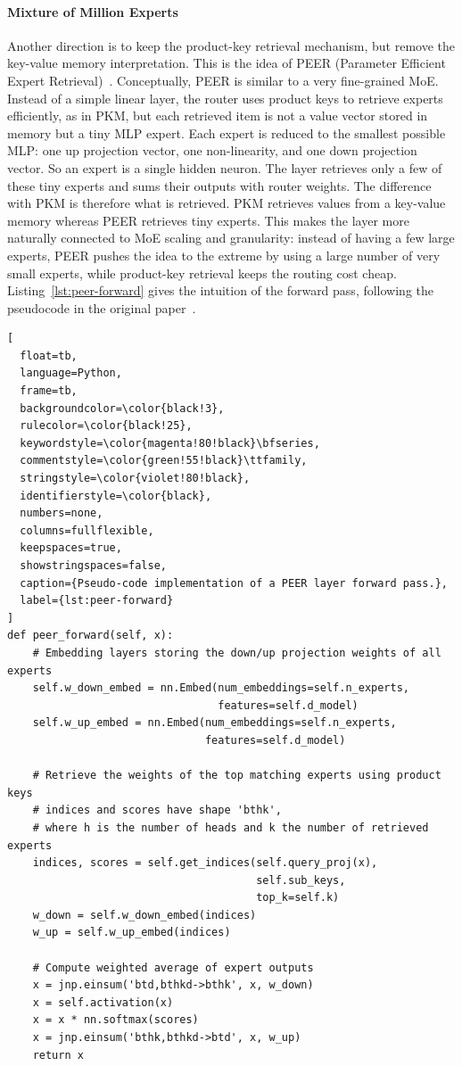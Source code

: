 \paragraph{Mixture of Million Experts}
Another direction is to keep the product-key retrieval mechanism, but remove the
key-value memory interpretation. This is the idea of PEER (Parameter Efficient
Expert Retrieval)~\citep{he2024mixturemillionexperts}. Conceptually,
PEER is similar to a very fine-grained MoE. Instead of a simple linear layer,
the router uses product keys to retrieve experts efficiently, as in PKM, 
but each retrieved item is not a value vector stored in memory but a tiny MLP expert.
Each expert is reduced to the smallest possible MLP: one up
projection vector, one non-linearity, and one down projection vector. So an
expert is a single hidden neuron. The layer retrieves only a few of these
tiny experts and sums their outputs with router weights.
The difference with PKM is therefore what is retrieved. PKM retrieves
values from a key-value memory whereas PEER retrieves tiny experts. This makes the
layer more naturally connected to MoE scaling and granularity: instead of having
a few large experts, PEER pushes the idea to the extreme by using a large
number of very small experts, while product-key retrieval keeps the routing cost
cheap. Listing~\ref{lst:peer-forward} gives the intuition of the forward pass,
following the pseudocode in the original paper~\citep{he2024mixturemillionexperts}.

\begin{lstlisting}[
  float=tb,
  language=Python,
  frame=tb,
  backgroundcolor=\color{black!3},
  rulecolor=\color{black!25},
  keywordstyle=\color{magenta!80!black}\bfseries,
  commentstyle=\color{green!55!black}\ttfamily,
  stringstyle=\color{violet!80!black},
  identifierstyle=\color{black},
  numbers=none,
  columns=fullflexible,
  keepspaces=true,
  showstringspaces=false,
  caption={Pseudo-code implementation of a PEER layer forward pass.},
  label={lst:peer-forward}
]
def peer_forward(self, x):
    # Embedding layers storing the down/up projection weights of all experts
    self.w_down_embed = nn.Embed(num_embeddings=self.n_experts,
                                 features=self.d_model)
    self.w_up_embed = nn.Embed(num_embeddings=self.n_experts,
                               features=self.d_model)

    # Retrieve the weights of the top matching experts using product keys
    # indices and scores have shape 'bthk',
    # where h is the number of heads and k the number of retrieved experts
    indices, scores = self.get_indices(self.query_proj(x),
                                       self.sub_keys,
                                       top_k=self.k)
    w_down = self.w_down_embed(indices)
    w_up = self.w_up_embed(indices)

    # Compute weighted average of expert outputs
    x = jnp.einsum('btd,bthkd->bthk', x, w_down)
    x = self.activation(x)
    x = x * nn.softmax(scores)
    x = jnp.einsum('bthk,bthkd->btd', x, w_up)
    return x
\end{lstlisting}

